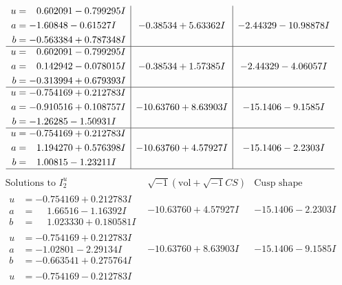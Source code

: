 \documentclass[1p]{elsarticle_modified}
\theoremstyle{definition}
\newcommand{\I}{\sqrt{-1}}
\begin{document}
$$\begin{array}{c|c|c}
\begin{aligned}
u &= \phantom{-}0.602091 - 0.799295 I \\
a &= -1.60848 - 0.61527 I \\
b &= -0.563384 + 0.787348 I\end{aligned}
 & -0.38534 + 5.63362 I & -2.44329 - 10.98878 I \\ \hline\begin{aligned}
u &= \phantom{-}0.602091 - 0.799295 I \\
a &= \phantom{-}0.142942 - 0.078015 I \\
b &= -0.313994 + 0.679393 I\end{aligned}
 & -0.38534 + 1.57385 I & -2.44329 - 4.06057 I \\ \hline\begin{aligned}
u &= -0.754169 + 0.212783 I \\
a &= -0.910516 + 0.108757 I \\
b &= -1.26285 - 1.50931 I\end{aligned}
 & -10.63760 + 8.63903 I & -15.1406 - 9.1585 I \\ \hline\begin{aligned}
u &= -0.754169 + 0.212783 I \\
a &= \phantom{-}1.194270 + 0.576398 I \\
b &= \phantom{-}1.00815 - 1.23211 I\end{aligned}
 & -10.63760 + 4.57927 I & -15.1406 - 2.2303 I\\
 \hline 
 \end{array}$$\newpage$$\begin{array}{c|c|c}  
\text{Solutions to }I^u_{2}& \I (\text{vol} + \sqrt{-1}CS) & \text{Cusp shape}\\
 \hline 
\begin{aligned}
u &= -0.754169 + 0.212783 I \\
a &= \phantom{-}1.66516 - 1.16392 I \\
b &= \phantom{-}1.023330 + 0.180581 I\end{aligned}
 & -10.63760 + 4.57927 I & -15.1406 - 2.2303 I \\ \hline\begin{aligned}
u &= -0.754169 + 0.212783 I \\
a &= -1.02801 - 2.29134 I \\
b &= -0.663541 + 0.275764 I\end{aligned}
 & -10.63760 + 8.63903 I & -15.1406 - 9.1585 I \\ \hline\begin{aligned}
u &= -0.754169 - 0.212783 I \\

\end{aligned}
\end{array}$$
\end{document}
